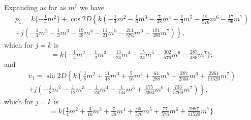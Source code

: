 \documentclass[11pt,a4paper]{article}
\theoremstyle{plain}
\theoremstyle{definition}
\theoremstyle{remark}
\begin{document}
Expanding as far as $m^{7}$ we have
\begin{multline*}
p_{1} = k\{-\tfrac14 m^{2}\} + \cos 2D\left\{k(-\tfrac14 m^{2} - \tfrac16 m^{3} - \tfrac{7}{48}m^{4} - \tfrac{1}{6}m^{5} - \tfrac{91}{576}m^{6} - \tfrac{17}{96}m^{7})\right.\\
\left. + j(-\tfrac14 m^{2} - \tfrac13 m^{3} - \tfrac{19}{48}m^{4} - \tfrac{11}{24}m^{5} - \tfrac{211}{576}m^{6} - \tfrac{191}{480}m^{7})\right\},
\end{multline*}
which for $j=k$ is
\[
= k\{-\tfrac14 m^{2} - \tfrac12 m^{3} - \tfrac{13}{24}m^{4} - \tfrac{15}{24}m^{5} - \tfrac{302}{576}m^{6} - \tfrac{287}{480}m^{7}\};
\]
and
\begin{multline*}
\upsilon_{1} = \sin 2D\left\{k(\tfrac38 m^{2} + \tfrac{11}{48}m^{3} + \tfrac{5}{16}m^{4} + \tfrac{61}{288}m^{5} + \tfrac{287}{2304}m^{6} + \tfrac{2261}{11520}m^{7})\right.\\
\left. + j(-\tfrac18 m^{2} - \tfrac{1}{12}m^{3} - \tfrac{1}{24}m^{4} + \tfrac{1}{144}m^{5} + \tfrac{175}{2304}m^{6} + \tfrac{733}{5760}m^{7})\right\},
\end{multline*}
which for $j=k$ is
\[
= k\{\tfrac14 m^{2} + \tfrac{3}{16}m^{3} + \tfrac{7}{48}m^{4} + \tfrac{65}{576}m^{5} + \tfrac{77}{576}m^{6} + \tfrac{2997}{11520}m^{7}\}.
\]
\end{document}

